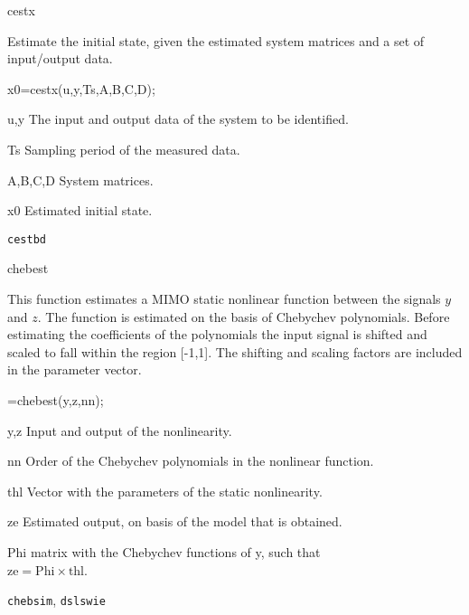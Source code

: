 \documentclass{book}
\newcommand{\chebsim}{\texttt{chebsim}}
\newcommand{\cestbd}{\texttt{cestbd}}
\newcommand{\dslswie}{\texttt{dslswie}}
\begin{document}
\begin{command}{cestx}
\begin{purpose}
  Estimate the initial state, given the estimated system matrices and
  a set of input/output data.
\end{purpose}
\begin{syntax}
  x0=cestx(u,y,Ts,A,B,C,D);
\end{syntax}
\begin{inputs}
\item[u,y] The input and output data of the system to be
  identified.
\item[Ts] Sampling period of the measured data.
\item[A,B,C,D] System matrices. 
\end{inputs}
\begin{outputs}
\item[x0] Estimated initial state.
\end{outputs}
\begin{seealso}
{\cestbd}
\end{seealso}
\end{command}%

\begin{command}{chebest}

\begin{purpose}
This function estimates a MIMO static nonlinear function
between the signals $y$ and $z$. The function is
estimated on the basis of Chebychev polynomials.
Before estimating the coefficients of the polynomials
the input signal is shifted and scaled to fall within the
region [-1,1]. The shifting and scaling factors are
included in the parameter vector.
\end{purpose}

\begin{syntax}
=chebest(y,z,nn);
\end{syntax}

\begin{inputs}
\item[y,z] Input and output of the nonlinearity.
\item[nn] Order of the Chebychev polynomials in the nonlinear
  function.
\end{inputs}

\begin{outputs}
\item[thl] Vector with the parameters of the static nonlinearity.
\item[ze] Estimated output, on basis of the model that is obtained.
\item[Phi] matrix with the Chebychev functions of y, such that\\
  $\mbox{ze}=\mbox{Phi}\times\mbox{thl}$.
\end{outputs}

\begin{seealso}
{\chebsim}, {\dslswie}
\end{seealso}
\end{command}%
\end{document}
